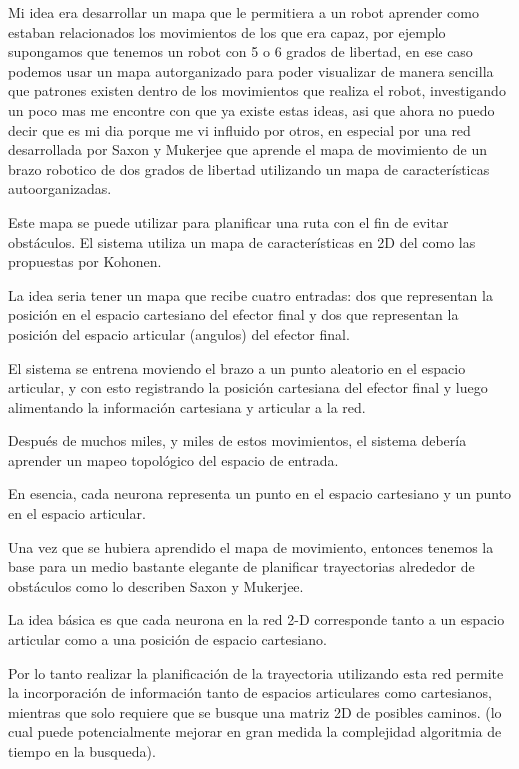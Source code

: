 \documentclass[fleqn, journal, onecolumn]{IEEEtran}             %
\theoremstyle{break}                                            %
\begin{document}
      Mi idea era desarrollar un mapa que le permitiera a un robot aprender como
      estaban relacionados los movimientos de los que era capaz, por ejemplo
      supongamos que tenemos un robot con 5 o 6 grados de libertad, en ese caso
      podemos usar un mapa autorganizado para poder visualizar de manera sencilla
      que patrones existen dentro de los movimientos que realiza el robot, investigando un poco
      mas me encontre con que ya existe estas ideas, asi que ahora no puedo decir que es mi dia porque
      me vi influido por otros, en especial por una
      red desarrollada por Saxon y Mukerjee que aprende el mapa de movimiento de un 
      brazo robotico de dos grados de libertad utilizando un mapa de características 
      autoorganizadas. 
      
      Este mapa se puede utilizar para planificar una ruta con el fin de evitar obstáculos.
      El sistema utiliza un mapa de características en 2D del como las  propuestas por Kohonen.

      La idea seria tener un mapa que recibe cuatro entradas: dos que representan la posición en el espacio cartesiano
      del efector final y dos que representan la posición del espacio articular (angulos) del efector final.

      El sistema se entrena moviendo el brazo a un punto aleatorio en el espacio articular, y
      con esto registrando la posición cartesiana del efector final y luego alimentando la información 
      cartesiana y articular a la red.
      
      Después de muchos miles, y miles de estos movimientos, el sistema debería
      aprender un mapeo topológico del espacio de entrada. 
      
      En esencia, cada neurona representa un punto en el espacio cartesiano y 
      un punto en el espacio articular.

      Una vez que se hubiera aprendido el mapa de movimiento, entonces tenemos la base 
      para un medio bastante elegante de planificar trayectorias alrededor de obstáculos 
      como lo describen Saxon y Mukerjee. 
      
      La idea básica es que cada neurona en la red 2-D corresponde tanto a un 
      espacio articular como a una posición de espacio cartesiano. 
      
      Por lo tanto realizar la planificación de la trayectoria utilizando esta red 
      permite la incorporación de información tanto de espacios articulares como cartesianos, 
      mientras que solo requiere que se busque una matriz 2D de posibles caminos. (lo cual
      puede potencialmente mejorar en gran medida la complejidad algoritmia de tiempo 
      en la busqueda).
      
\end{document}
